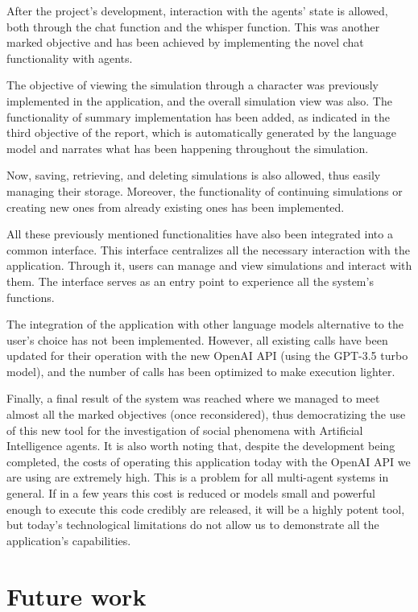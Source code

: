 After the project's development, interaction with the agents' state is allowed, both through the chat function and the whisper function. This was another marked objective and has been achieved by implementing the novel chat functionality with agents.

The objective of viewing the simulation through a character was previously implemented in the application, and the overall simulation view was also. The functionality of summary implementation has been added, as indicated in the third objective of the report, which is automatically generated by the language model and narrates what has been happening throughout the simulation.

Now, saving, retrieving, and deleting simulations is also allowed, thus easily managing their storage. Moreover, the functionality of continuing simulations or creating new ones from already existing ones has been implemented.

All these previously mentioned functionalities have also been integrated into a common interface. This interface centralizes all the necessary interaction with the application. Through it, users can manage and view simulations and interact with them. The interface serves as an entry point to experience all the system's functions.

The integration of the application with other language models alternative to the user's choice has not been implemented. However, all existing calls have been updated for their operation with the new OpenAI API (using the GPT-3.5 turbo model), and the number of calls has been optimized to make execution lighter.

Finally, a final result of the system was reached where we managed to meet almost all the marked objectives (once reconsidered), thus democratizing the use of this new tool for the investigation of social phenomena with Artificial Intelligence agents. It is also worth noting that, despite the development being completed, the costs of operating this application today with the OpenAI API we are using are extremely high. This is a problem for all multi-agent systems in general. If in a few years this cost is reduced or models small and powerful enough to execute this code credibly are released, it will be a highly potent tool, but today's technological limitations do not allow us to demonstrate all the application's capabilities.

\section*{Future work}

